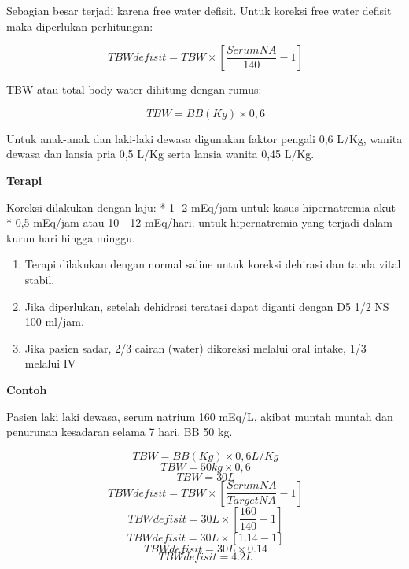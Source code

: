 \documentclass[
]{book}
\providecommand{\tightlist}{%
  \setlength{\itemsep}{0pt}\setlength{\parskip}{0pt}}
\begin{document}
Sebagian besar terjadi karena free water defisit. Untuk koreksi free water defisit maka diperlukan perhitungan:

\begin{equation}
\ TBW defisit = TBW \times [\frac{Serum NA}{140} - 1]
\end{equation}

TBW atau total body water dihitung dengan rumus:

\begin{equation}
\ TBW = BB (Kg) \times 0,6
\end{equation}

Untuk anak-anak dan laki-laki dewasa digunakan faktor pengali 0,6 L/Kg, wanita dewasa dan lansia pria 0,5 L/Kg serta lansia wanita 0,45 L/Kg.

\textbf{Terapi}

Koreksi dilakukan dengan laju:
* 1 -2 mEq/jam untuk kasus hipernatremia akut
* 0,5 mEq/jam atau 10 - 12 mEq/hari. untuk hipernatremia yang terjadi dalam kurun hari hingga minggu.

\begin{enumerate}
\def\labelenumi{\arabic{enumi}.}
\tightlist
\item
  Terapi dilakukan dengan normal saline untuk koreksi dehirasi dan tanda vital stabil.
\item
  Jika diperlukan, setelah dehidrasi teratasi dapat diganti dengan D5 1/2 NS 100 ml/jam.
\item
  Jika pasien sadar, 2/3 cairan (water) dikoreksi melalui oral intake, 1/3 melalui IV
\end{enumerate}

\textbf{Contoh}

Pasien laki laki dewasa, serum natrium 160 mEq/L, akibat muntah muntah dan penurunan kesadaran selama 7 hari. BB 50 kg.

\begin{equation}
\ TBW = BB (Kg) \times 0,6 L/Kg
\end{equation}
\begin{equation}
\ TBW = 50kg \times 0,6 
\end{equation}
\begin{equation}
\ TBW = 30 L
\end{equation}
\begin{equation}
\ TBW defisit = TBW \times [\frac{Serum NA}{Target NA} - 1]
\end{equation}
\begin{equation}
\ TBW defisit = 30 L \times [\frac{160}{140} - 1]
\end{equation}
\begin{equation}
\ TBW defisit = 30 L \times [1.14 - 1]
\end{equation}
\begin{equation}
\ TBW defisit = 30 L \times 0.14
\end{equation}
\begin{equation}
\ TBW defisit = 4.2 L
\end{equation}
\end{document}
